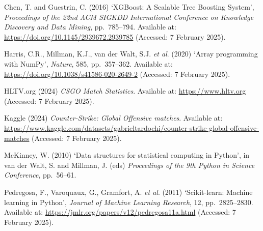 \documentclass[12pt,a4paper]{article}
\begin{document}
\begin{list}{}{%
  \setlength{\leftmargin}{2em}%
  \setlength{\itemindent}{-2em}%
  \setlength{\itemsep}{0.75em}%
  \setlength{\parsep}{0pt}}

\item Chen, T. and Guestrin, C. (2016) `XGBoost: A Scalable Tree Boosting System', \textit{Proceedings of the 22nd ACM SIGKDD International Conference on Knowledge Discovery and Data Mining}, pp.\ 785--794. Available at: \url{https://doi.org/10.1145/2939672.2939785} (Accessed: 7 February 2025).

\item Harris, C.R., Millman, K.J., van der Walt, S.J. \textit{et al}. (2020) `Array programming with NumPy', \textit{Nature}, 585, pp.\ 357--362. Available at: \url{https://doi.org/10.1038/s41586-020-2649-2} (Accessed: 7 February 2025).

\item HLTV.org (2024) \textit{CSGO Match Statistics}. Available at: \url{https://www.hltv.org} (Accessed: 7 February 2025).

\item Kaggle (2024) \textit{Counter-Strike: Global Offensive matches}. Available at: \url{https://www.kaggle.com/datasets/gabrieltardochi/counter-strike-global-offensive-matches} (Accessed: 7 February 2025).

\item McKinney, W. (2010) `Data structures for statistical computing in Python', in van der Walt, S. and Millman, J. (eds) \textit{Proceedings of the 9th Python in Science Conference}, pp.\ 56--61.

\item Pedregosa, F., Varoquaux, G., Gramfort, A. \textit{et al}. (2011) `Scikit-learn: Machine learning in Python', \textit{Journal of Machine Learning Research}, 12, pp.\ 2825--2830. Available at: \url{https://jmlr.org/papers/v12/pedregosa11a.html} (Accessed: 7 February 2025).

\end{list}

\end{document}
